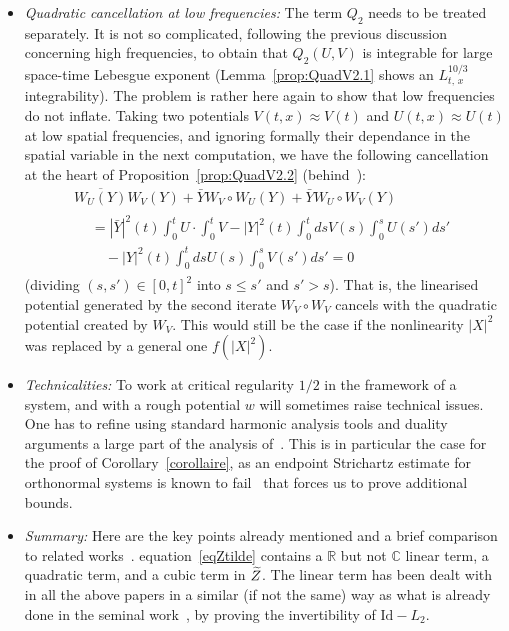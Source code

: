 \documentclass[AHL, Unicode, longabstracts,published]{cedram}
\newcommand{\R}{\mathbb{R}}
\newcommand{\C}{\mathbb{C}}
\newcommand{\Id}{\mathrm{Id}}
\let\oldtilde\tilde
\renewcommand*{\tilde}[1]{\mathchoice{\widetilde{#1}}{\widetilde{#1}}{\oldtilde{#1}}{\oldtilde{#1}}}
\begin{document}
\begin{itemize}
\item \emph{Quadratic cancellation at low frequencies:} The term $Q_2$ needs to be treated separately. It is not so complicated, following the previous discussion concerning high frequencies, to obtain that $Q_2(U,V)$ is integrable for large space-time Lebesgue exponent (Lemma~\ref{prop:QuadV2.1} shows an $L^{10/3}_{t,\,x}$ integrability). The problem is rather here again to show that low frequencies do not inflate. Taking two potentials $V(t,x)\approx V(t)$ and $U(t,x)\approx U(t)$ at low spatial frequencies, and ignoring formally their dependance in the spatial variable in the next computation, we have the following cancellation at the heart of Proposition~\ref{prop:QuadV2.2} (behind~\cite[Proposition~4]{lewsab2}):
\begin{multline*}
\overline{W_U(Y)}W_V(Y)+\bar YW_V\circ W_U (Y)+\bar YW_U\circ W_V (Y)\\
\begin{aligned}
&= |\bar Y|^2(t)\int_0^tU \cdot \int_0^t V-|Y|^2(t) \int_0^tds V(s)\int_0^sU(s')ds'\\
&\quad -|Y|^2(t) \int_0^tds U(s)\int_0^sV(s')ds'=0
\end{aligned}
\end{multline*}
(dividing $(s,s')\in [0,t]^2$ into $s\leq s'$ and $s'>s$). That is, the linearised potential generated by the second iterate $W_V\circ W_V$ cancels with the quadratic potential created by $W_V$. This would still be the case if the nonlinearity $|X|^2$ was replaced by a general one $f(|X|^2)$.

\item \emph{Technicalities:} To work at critical regularity $1/2$ in the framework of a system, and with a rough potential $w$ will sometimes raise technical issues. One has to refine using standard harmonic analysis tools and duality arguments a large part of the analysis of~\cite{CodS,lewsab2}. This is in particular the case for the proof of Corollary~\ref{corollaire}, as an endpoint Strichartz estimate for orthonormal systems is known to fail~\cite{FLLS,FS} that forces us to prove additional bounds.


\item \emph{Summary:} Here are the key points already mentioned and a brief comparison to related works~\cite{CHP2,CodS,lewsab2}. equation~\eqref{eqZtilde} contains a $\R$ but not $\C$ linear term, a quadratic term, and a cubic term in $\tilde Z$. The linear term has been dealt with in all the above papers in a similar (if not the same) way as what is already done in the seminal work~\cite{lewsab2}, by proving the invertibility of $\Id - L_2$.
\end{itemize}
\end{document}
